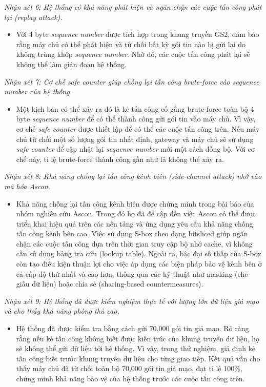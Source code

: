 \textit{Nhận xét 6: Hệ thống có khả năng phát hiện và ngăn chặn các cuộc tấn công phát lại (replay attack).}
\begin{itemize}
    \item Với 4 byte \textit{sequence number} được tích hợp trong khung truyền GS2, đảm bảo rằng máy chủ có thể phát hiện và từ chối bất kỳ gói tin nào bị gửi lại do không trùng khớp \textit{sequence number}. Nhờ đó, các cuộc tấn công phát lại sẽ không thể làm gián đoạn hệ thống.
\end{itemize}

\textit{Nhận xét 7: Cơ chế safe counter giúp chống lại tấn công brute-force vào sequence number của hệ thống.}
\begin{itemize}
    \item Một kịch bản có thể xảy ra đó là kẻ tấn công cố gắng brute-force toàn bộ 4 byte \textit{sequence number} để có thể thành công gửi gói tin vào máy chủ. Vì vậy, cơ chế \textit{safe counter} được thiết lập để có thể các cuộc tấn công trên. Nếu máy chủ từ chối một số lượng gói tin nhất định, gateway và máy chủ sẽ sử dụng \textit{safe counter} để cập nhật lại \textit{sequence number} mới một cách đồng bộ. Với cơ chế này, tỉ lệ brute-force thành công gần như là không thể xảy ra. 
\end{itemize}

\textit{Nhận xét 8: Khả năng chống lại tấn công kênh biên (side-channel attack) nhờ vào mã hóa Ascon.}
\begin{itemize}
    \item Khả năng chống lại tấn công kênh biên được chứng minh trong bài báo \cite{asconv1.2} của nhóm nghiên cứu Ascon. Trong đó họ đã đề cập đến việc
    Ascon có thể được triển khai hiệu quả trên các nền tảng và ứng dụng yêu cầu khả năng chống tấn công kênh bên cao. Việc sử dụng S-box theo dạng bitsliced giúp ngăn chặn các cuộc tấn công dựa trên thời gian truy cập bộ nhớ cache, vì không cần sử dụng bảng tra cứu (lookup table). Ngoài ra, bậc đại số thấp của S-box còn tạo điều kiện thuận lợi cho việc áp dụng các biện pháp bảo vệ kênh bên ở cả cấp độ thứ nhất và cao hơn, thông qua các kỹ thuật như masking (che giấu dữ liệu) hoặc chia sẻ (sharing-based countermeasures). 
\end{itemize}

\textit{Nhận xét 9: Hệ thống đã được kiểm nghiệm thực tế với lượng lớn dữ liệu giả mạo và cho thấy khả năng phòng thủ cao.}
\begin{itemize}
    \item Hệ thống đã được kiểm tra bằng cách gửi 70,000 gói tin giả mạo. Rõ ràng rằng nếu kẻ tấn công không biết được kiến trúc của khung truyền dữ liệu, họ sẽ không thể gửi dữ liệu tới hệ thống. Vì vậy, trong thử nghiệm, giả định kẻ tấn công biết trước khung truyền dữ liệu cho từng giao tiếp. Kết quả vẫn cho thấy máy chủ đã từ chối toàn bộ 70,000 gói tin giả mạo, đạt tỉ lệ 100\%, chứng minh khả năng bảo vệ của hệ thống trước các cuộc tấn công trên.
\end{itemize}

